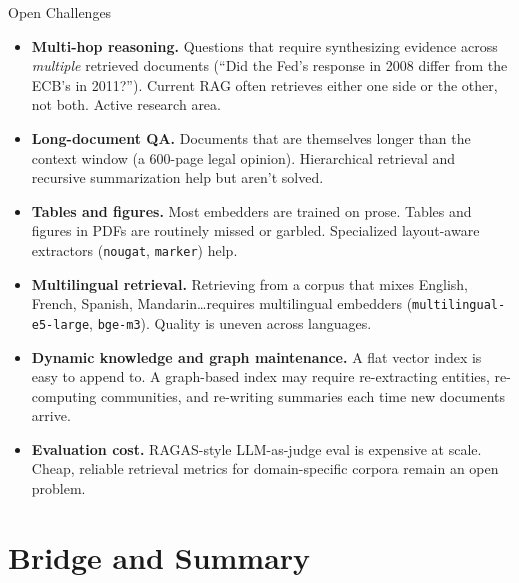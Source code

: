 \documentclass[10pt,english,aspectratio=169]{beamer}
\begin{document}
\begin{frame}{Open Challenges}
\begin{itemize}
\item \textbf{Multi-hop reasoning.} Questions that require synthesizing evidence across \emph{multiple} retrieved documents (``Did the Fed's response in 2008 differ from the ECB's in 2011?''). Current RAG often retrieves either one side or the other, not both. Active research area.

\medskip
\item \textbf{Long-document QA.} Documents that are themselves longer than the context window (a 600-page legal opinion). Hierarchical retrieval and recursive summarization help but aren't solved.

\medskip
\item \textbf{Tables and figures.} Most embedders are trained on prose. Tables and figures in PDFs are routinely missed or garbled. Specialized layout-aware extractors (\texttt{nougat}, \texttt{marker}) help.

\medskip
\item \textbf{Multilingual retrieval.} Retrieving from a corpus that mixes English, French, Spanish, Mandarin\dots requires multilingual embedders (\texttt{multilingual-e5-large}, \texttt{bge-m3}). Quality is uneven across languages.

\medskip
\item \textbf{Dynamic knowledge and graph maintenance.} A flat vector index is easy to append to. A graph-based index may require re-extracting entities, re-computing communities, and re-writing summaries each time new documents arrive.

\medskip
\item \textbf{Evaluation cost.} RAGAS-style LLM-as-judge eval is expensive at scale. Cheap, reliable retrieval metrics for domain-specific corpora remain an open problem.
\end{itemize}
\end{frame}

\section{Bridge and Summary}
\end{document}
